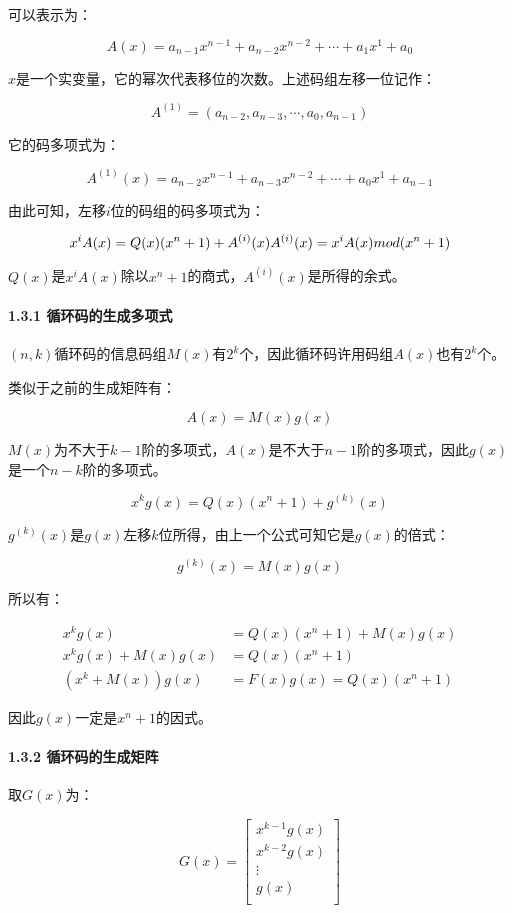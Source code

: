 \documentclass[
]{article}
\begin{document}
可以表示为：

$$
A(x) = a_{n-1}x^{n-1}+a_{n-2}x^{n-2}+\cdots+a_{1}x^{1}+a_{0}
$$

$x$是一个实变量，它的幂次代表移位的次数。上述码组左移一位记作：

$$
A^{(1)} = (a_{n-2},a_{n-3},\cdots,a_{0},a_{n-1})
$$

它的码多项式为：

$$
A^{(1)}(x) = a_{n-2}x^{n-1}+a_{n-3}x^{n-2}+\cdots+a_{0}x^{1}+a_{n-1}
$$

由此可知，左移$i$位的码组的码多项式为：

$$x^iA(x) = Q(x)(x^n+1)+A^{(i)}(x)\\
A^{(i)}(x) = x^iA(x) \space mod \space (x^n+1)$$

$Q(x)$是$x^iA(x)$除以$x^n+1$的商式，$A^{(i)}(x)$是所得的余式。

\hypertarget{header-n44}{%
\paragraph{1.3.1 循环码的生成多项式}\label{header-n44}}

$(n,k)$循环码的信息码组$M(x)$有$2^k$个，因此循环码许用码组$A(x)$也有$2^k$个。

类似于之前的生成矩阵有：

$$
A(x)=M(x)g(x)
$$

$M(x)$为不大于$k-1$阶的多项式，$A(x)$是不大于$n-1$阶的多项式，因此$g(x)$是一个$n-k$阶的多项式。

$$
x^kg(x)=Q(x)(x^n+1)+g^{(k)}(x)
$$

$g^{(k)}(x)$是$g(x)$左移$k$位所得，由上一个公式可知它是$g(x)$的倍式：

$$
g^{(k)}(x)=M(x)g(x)
$$

所以有：

\begin{align}
x^kg(x)&=Q(x)(x^n+1)+M(x)g(x)\\
x^kg(x)+M(x)g(x)&=Q(x)(x^n+1)\\
(x^k+M(x))g(x)&=F(x)g(x)=Q(x)(x^n+1)
\end{align}

因此$g(x)$一定是$x^n+1$的因式。

\hypertarget{header-n55}{%
\paragraph{1.3.2 循环码的生成矩阵}\label{header-n55}}

取$G(x)$为：

$$
G(x)=
\left[
\begin{matrix}
x^{k-1}g(x)\\
x^{k-2}g(x)\\
 \vdots \\
g(x)\\
\end{matrix}
\right]
$$
\end{document}
